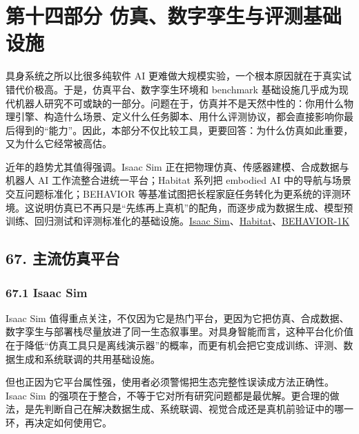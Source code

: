 
\part*{第十四部分 仿真、数字孪生与评测基础设施}

具身系统之所以比很多纯软件 AI 更难做大规模实验，一个根本原因就在于真实试错代价极高。于是，仿真平台、数字孪生环境和 benchmark 基础设施几乎成为现代机器人研究不可或缺的一部分。问题在于，仿真并不是天然中性的：你用什么物理引擎、构造什么场景、定义什么任务脚本、用什么评测协议，都会直接影响你最后得到的“能力”。因此，本部分不仅比较工具，更要回答：为什么仿真如此重要，又为什么它经常被高估。

近年的趋势尤其值得强调。Isaac Sim 正在把物理仿真、传感器建模、合成数据与机器人 AI 工作流整合进统一平台；Habitat 系列把 embodied AI 中的导航与场景交互问题标准化；BEHAVIOR 等基准试图把长程家庭任务转化为更系统的评测环境。这说明仿真已不再只是“先练再上真机”的配角，而逐步成为数据生成、模型预训练、回归测试和评测标准化的基础设施。\href{https://developer.nvidia.com/isaac/sim}{Isaac Sim}、\href{https://aihabitat.org/}{Habitat}、\href{https://behavior.stanford.edu/behavior-1k}{BEHAVIOR-1K}

\chapter*{67. 主流仿真平台}

\section*{67.1 Isaac Sim}


Isaac Sim 值得重点关注，不仅因为它是热门平台，更因为它把仿真、合成数据、数字孪生与部署栈尽量放进了同一生态叙事里。对具身智能而言，这种平台化价值在于降低“仿真工具只是离线演示器”的概率，而更有机会把它变成训练、评测、数据生成和系统联调的共用基础设施。

但也正因为它平台属性强，使用者必须警惕把生态完整性误读成方法正确性。Isaac Sim 的强项在于整合，不等于它对所有研究问题都是最优解。更合理的做法，是先判断自己在解决数据生成、系统联调、视觉合成还是真机前验证中的哪一环，再决定如何使用它。

